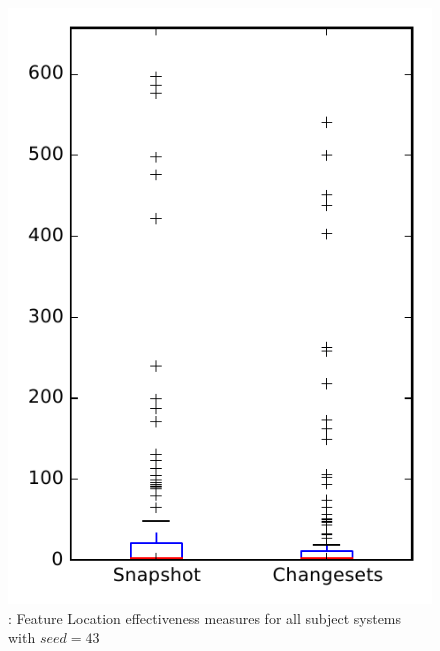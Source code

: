 
\begin{figure}
\centering
\includegraphics[height=0.4\textheight]{figures/flt_seed/rq1_overview_43}
\caption{\rone: Feature Location effectiveness measures for all subject systems with $seed=43$}
\label{fig:flt_seed:rq1:overview}
\end{figure}
